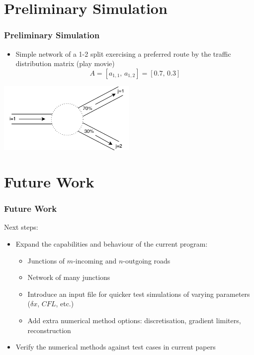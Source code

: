 \documentclass[12pt]{beamer}
\begin{document}
\section{Preliminary Simulation}
	\begin{frame}
		\frametitle{Preliminary Simulation}
		\begin{itemize}
		    \item Simple network of a 1-2 split exercising a preferred route by the traffic distribution matrix (play movie)
		    $$A=[a_{1,1},\,a_{1,2}]=[0.7,\,0.3]$$
		\end{itemize}
		\vspace{0.5cm}
		\centering
		\includegraphics[width=0.5\textwidth]{1to2.pdf}
	\end{frame}
	
\section{Future Work}
	\begin{frame}
		\frametitle{Future Work}
		Next steps:
		\begin{itemize}
		    \item Expand the capabilities and behaviour of the current program:
		    \begin{itemize}
		        \item Junctions of $m$-incoming and $n$-outgoing roads
		        \item Network of many junctions
		        \item Introduce an input file for quicker test simulations of varying parameters ($\delta x$, $CFL$, etc.)
		        \item Add extra numerical method options: discretisation, gradient limiters, reconstruction
		    \end{itemize}
		    \item Verify the numerical methods against test cases in current papers
		\end{itemize}
	\end{frame}
\end{document}
